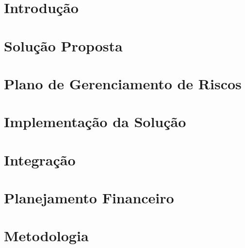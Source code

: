 % 



\chapter{Introdução} %


\chapter{Solução Proposta} %

\label{cha:solucao}


\chapter{Plano de Gerenciamento de Riscos}

\label{cha:riscos}

\chapter{Implementação da Solução}

\label{cha:solucao2}

\chapter{Integração}

\label{cha:integracao}

\chapter{Planejamento Financeiro}

\label{cha:financeiro}

\chapter{Metodologia}

\label{cha:metodologia}
